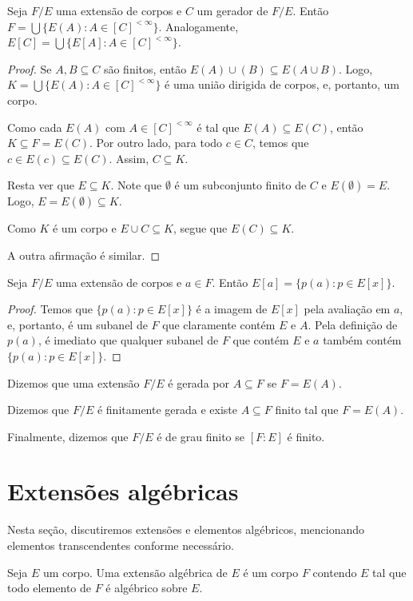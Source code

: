 \begin{lemma}
    Seja $F/E$ uma extensão de corpos e $C$ um gerador de $F/E$. Então $F=\bigcup\{E(A): A \in [C]^{<\infty}\}$. Analogamente, $E[C]=\bigcup\{E[A]: A \in [C]^{<\infty}\}$.
\end{lemma}

\begin{proof}
    Se $A, B\subseteq C$ são finitos, então $E(A)\cup (B)\subseteq E(A\cup B)$. Logo, $K=\bigcup \{E(A): A \in [C]^{<\infty}\}$ é uma união dirigida de corpos, e, portanto, um corpo.

    Como cada $E(A)$ com $A\in [C]^{<\infty}$ é tal que $E(A)\subseteq E(C)$, então $K\subseteq F=E(C)$.
    Por outro lado, para todo $c \in C$, temos que $c \in E(c)\subseteq E(C)$.
    Assim, $C\subseteq K$.

    Resta ver que $E\subseteq K$. Note que $\emptyset$ é um subconjunto finito de $C$ e $E(\emptyset)=E$. Logo, $E=E(\emptyset)\subseteq K$.

    Como $K$ é um corpo e $E\cup C\subseteq K$, segue que $E(C)\subseteq K$.

    A outra afirmação é similar.
\end{proof}

\begin{lemma}
    Seja $F/E$ uma extensão de corpos e $a \in F$. Então $E[a]=\{p(a): p \in E[x]\}$.
\end{lemma}

\begin{proof}
    Temos que $\{p(a): p \in E[x]\}$ é a imagem de $E[x]$ pela avaliação em $a$, e, portanto, é um subanel de $F$ que claramente contém $E$ e $A$. Pela definição de $p(a)$, é imediato que qualquer subanel de $F$ que contém $E$ e $a$ também contém $\{p(a): p \in E[x]\}$.
\end{proof}
\begin{definition}
Dizemos que uma extensão $F/E$ é gerada por $A\subseteq F$ se $F=E(A)$.

Dizemos que $F/E$ é finitamente gerada e existe $A\subseteq F$ finito tal que $F=E(A)$.

Finalmente, dizemos que $F/E$ é de grau finito se $[F:E]$ é finito.
\end{definition}
\section{Extensões algébricas}
Nesta seção, discutiremos extensões e elementos algébricos, mencionando elementos transcendentes conforme necessário.
\begin{definition}
Seja $E$ um corpo.
Uma extensão algébrica de $E$ é um corpo $F$ contendo $E$ tal que todo elemento de $F$ é algébrico sobre $E$.
\end{definition}

